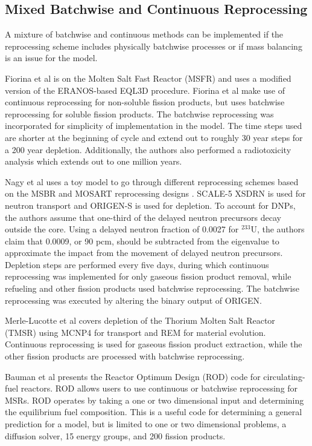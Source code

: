 \subsection{Mixed Batchwise and Continuous Reprocessing}
\label{litrev-msr-mixed}

A mixture of batchwise and continuous methods can be implemented if the reprocessing scheme includes physically batchwise processes or if mass balancing is an issue for the model.

Fiorina et al \cite{fiorina_preliminary_2012} is on the Molten Salt Fast Reactor (MSFR) and uses a modified version of the ERANOS-based EQL3D procedure. Fiorina et al make use of continuous reprocessing for non-soluble fission products, but uses batchwise reprocessing for soluble fission products. The batchwise reprocessing was incorporated for simplicity of implementation in the model. The time steps used are shorter at the beginning of cycle and extend out to roughly 30 year steps for a 200 year depletion. Additionally, the authors also performed a radiotoxicity analysis which extends out to one million years.

Nagy et al \cite{nagy_parametric_2008} uses a toy model to go through different reprocessing schemes based on the MSBR and MOSART reprocessing designs \cite{robertson_conceptual_1971, ignatiev_progress_2007}. SCALE-5 XSDRN\cite{noauthor_scale_2005} is used for neutron transport and ORIGEN-S is used for depletion. To account for DNPs, the authors assume that one-third of the delayed neutron precursors decay outside the core.
Using a delayed neutron fraction of 0.0027 for $^{233}$U, the authors claim that 0.0009, or 90 pcm, should be subtracted from the eigenvalue to approximate the impact from the movement of delayed neutron precursors.
Depletion steps are performed every five days, during which continuous reprocessing was implemented for only gaseous fission product removal, while refueling and other fission products used batchwise reprocessing.
The batchwise reprocessing was executed by altering the binary output of ORIGEN.

Merle-Lucotte et al \cite{merle-lucotte_thorium_2007} covers depletion of the Thorium Molten Salt Reactor (TMSR) using MCNP4 \cite{goluoglu_software_1998} for transport and REM for material evolution. Continuous reprocessing is used for gaseous fission product extraction, while the other fission products are processed with batchwise reprocessing.

Bauman et al \cite{h_f_bauman_rod_1971} presents the Reactor Optimum Design (ROD) code for circulating-fuel reactors.
ROD allows users to use continuous or batchwise reprocessing for MSRs. ROD operates by taking a one or two dimensional input and determining the equilibrium fuel composition. This is a useful code for determining a general prediction for a model, but is limited to one or two dimensional problems, a diffusion solver, 15 energy groups, and 200 fission products.

